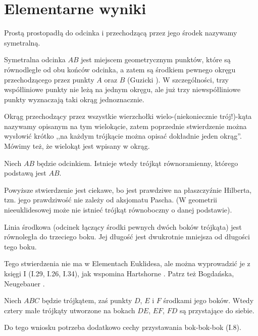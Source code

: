 \section{Elementarne wyniki}

\begin{definition}[symetralna]
    \label{def_symetralna}
	Prostą prostopadłą do odcinka i przechodzącą przez jego środek nazywamy symetralną.
\end{definition}

Symetralna odcinka $AB$ jest miejscem geometrycznym punktów, które są równodległe od obu końców odcinka, a zatem są środkiem pewnego okręgu przechodzącego przez punkty $A$ oraz $B$ (Guzicki \cite[s. 14, 15]{guzicki_2021}).
W szczególności, trzy współliniowe punkty nie leżą na jednym okręgu, ale już trzy niewspółliniowe punkty wyznaczają taki okrąg jednoznacznie.

Okrąg przechodzący przez wszystkie wierzchołki wielo-(niekoniecznie trój!)-kąta nazywamy opisanym na tym wielokącie, zatem poprzednie stwierdzenie można wysłowić krótko ,,na każdym trójkącie można opisać dokładnie jeden okrąg''.
Mówimy też, że wielokąt jest wpisany w okrąg.
%


\begin{proposition}
	\label{hartshorne_52x}
    Niech $AB$ będzie odcinkiem.
	Istnieje wtedy trójkąt równoramienny, którego podstawą jest $AB$.
\end{proposition}

Powyższe stwierdzenie jest ciekawe, bo jest prawdziwe na płaszczyźnie Hilberta, tzn. jego prawdziwość nie zależy od aksjomatu Pascha.
(W geometrii nieeuklidesowej może nie istnieć trójkąt równoboczny o danej podstawie).

\begin{proposition}
	\label{hartshorne_52}
	Linia środkowa (odcinek łączący środki pewnych dwóch boków trójkąta) jest równoległa do trzeciego boku.
    Jej długość jest dwukrotnie mniejsza od długości tego boku.
\end{proposition}

Tego stwierdzenia nie ma w Elementach Euklidesa, ale można wyprowadzić je z księgi I (I.29, I.26, I.34), jak wspomina Hartshorne \cite[s. 45, 52. 53]{hartshorne2000}.
Patrz też Bogdańska, Neugebauer \cite[s. 15]{neugebauer_2018}.

\begin{corollary}
	Niech $ABC$ będzie trójkątem, zaś punkty $D$, $E$ i $F$ środkami jego boków.
	Wtedy cztery małe trójkąty utworzone na bokach $DE$, $EF$, $FD$ są przystające do siebie.
\end{corollary}

Do tego wniosku potrzeba dodatkowo cechy przystawania bok-bok-bok (I.8).
%



%